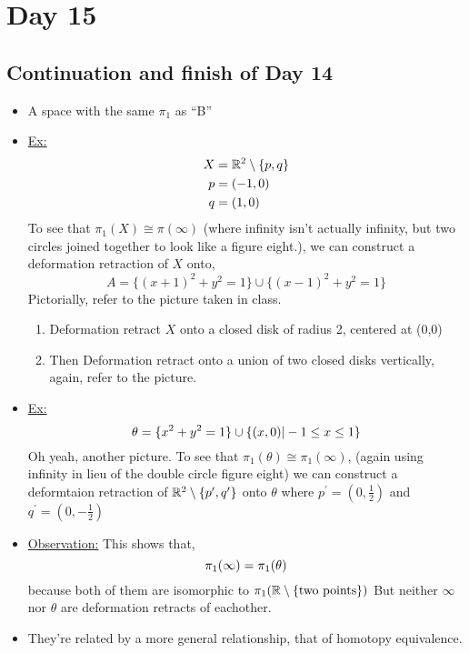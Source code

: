 \documentclass[../notes.tex]{subfiles}
\begin{document}
\section{Day 15}
\subsection{Continuation and finish of Day 14}
\begin{itemize}
    \item A space with the same $\pi_1$ as ``B''
    \item \underline{Ex:}
        \begin{align*}
            X &= \mathbb{R}^2\setminus\{p,q\}\\
            p &= (-1,0)\\
            q &= (1,0)\\
        \end{align*}
        To see that $\pi_1(X) \cong \pi(\infty)$ (where infinity isn't actually infinity,
        but two circles joined together to look like a figure eight.), we can construct a 
        deformation retraction of $X$ onto,
        \[
            A=\{(x+1)^2+y^2=1\}\cup \{(x-1)^2+y^2=1\}
        \]
        Pictorially, refer to the picture taken in class.
        \begin{enumerate}
            \item Deformation retract $X$ onto a closed disk of radius 2, centered
                at (0,0)
            \item Then Deformation retract onto a union of two closed disks vertically, 
                again, refer to the picture.
        \end{enumerate}
    \item
        \underline{Ex:}
        \[
            \theta=\{x^2+y^2=1\}\cup\{(x,0)| -1 \leq x \leq 1\}\\
        \]
        Oh yeah, another picture. To see that $\pi_1(\theta)\cong\pi_{1}(\infty)$,
        (again using infinity in lieu of the double circle figure eight)
        we can construct a deformtaion retraction of $\mathbb{R}^2\setminus\{p^{\prime},q^{\prime}\}$
        onto $\theta$ where $p^{\prime}=(0,\frac{1}{2})$ and $q^{\prime}=(0,-\frac{1}{2})$
    \item \underline{Observation:} This shows that,
        \[
            \pi_1(\infty)=\pi_1(\theta)\\
        \]
        because both of them are isomorphic to $\pi_1(\mathbb{R}\setminus\{\text{two points}\})$
        But neither $\infty$ nor $\theta$ are deformation retracts of eachother.
    \item They're related by a more general relationship, that of homotopy equivalence.
\end{itemize}
\end{document}
